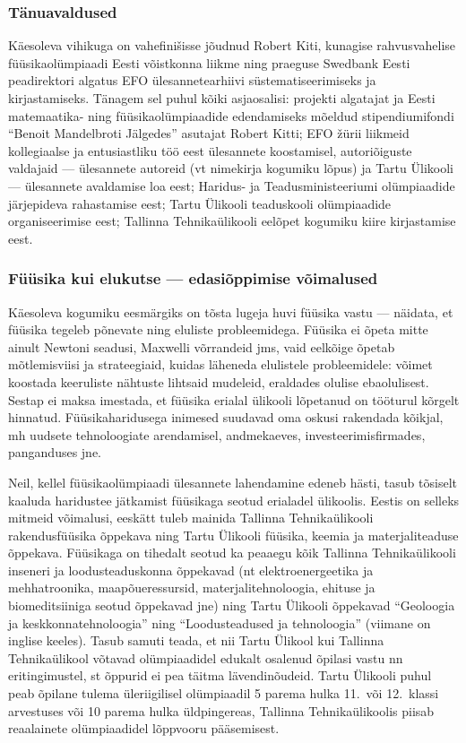\documentclass[11pt]{article}
\begin{document}
{{\subsubsection*{Tänuavaldused}
Käesoleva vihikuga on vahefinišisse jõudnud Robert Kiti, kunagise rahvusvahelise
füüsikaolümpiaadi Eesti võistkonna liikme ning
praeguse Swedbank Eesti peadirektori algatus EFO
ülesannetearhiivi süstematiseerimiseks ja kirjastamiseks.
Tänagem sel puhul kõiki asjaosalisi: projekti algatajat ja Eesti matemaatika- ning
füüsikaolümpiaadide edendamiseks mõeldud stipendiumifondi ``Benoit Mandelbroti Jälgedes'' asutajat Robert Kitti; EFO žürii liikmeid kollegiaalse ja entusiastliku töö eest ülesannete koostamisel,
autoriõiguste valdajaid --- ülesannete autoreid (vt nimekirja kogumiku lõpus) ja Tartu Ülikooli ---  ülesannete avaldamise loa eest;
Haridus- ja Teadusministeeriumi olümpiaadide järjepideva rahastamise eest; Tartu Ülikooli teaduskooli
olümpiaadide organiseerimise eest; Tallinna Tehnikaülikooli eelõpet
kogumiku kiire kirjastamise eest.

\subsubsection*{Füüsika kui elukutse --- edasiõppimise võimalused}
Käesoleva kogumiku eesmärgiks on tõsta lugeja huvi füüsika vastu --- näidata, et füüsika tegeleb põnevate ning
eluliste probleemidega. Füüsika ei õpeta mitte ainult Newtoni seadusi, Maxwelli võrrandeid jms, vaid eelkõige
õpetab mõtlemisviisi ja strateegiaid, kuidas läheneda elulistele probleemidele: võimet koostada keeruliste nähtuste
lihtsaid mudeleid, eraldades olulise ebaolulisest. Sestap ei maksa imestada, et
füüsika erialal ülikooli lõpetanud on tööturul kõrgelt hinnatud.
Füüsikaharidusega inimesed suudavad oma oskusi rakendada kõikjal, mh uudsete tehnoloogiate
arendamisel, andmekaeves, investeerimisfirmades, panganduses jne.

Neil, kellel füüsikaolümpiaadi ülesannete lahendamine edeneb hästi, tasub tõsiselt kaaluda haridustee jätkamist
füüsikaga seotud erialadel ülikoolis. Eestis on selleks mitmeid võimalusi, eeskätt tuleb mainida
{Tallinna Tehnikaülikooli rakendusfüüsika õppekava ning Tartu Ülikooli füüsika, keemia ja materjaliteaduse õppekava}.
Füüsikaga on tihedalt seotud ka peaaegu kõik
Tallinna Tehnikaülikooli inseneri ja loodusteaduskonna õppekavad (nt elektroenergeetika ja mehhatroonika, maapõueressursid,
materjalitehnoloogia, ehituse ja biomeditsiiniga seotud õppekavad jne) ning  Tartu Ülikooli õppekavad
``Geoloogia ja keskkonnatehnoloogia'' ning ``Loodusteadused ja tehnoloogia'' (viimane on inglise keeles).
Tasub samuti teada, et nii  Tartu Ülikool kui Tallinna Tehnikaülikool võtavad olümpiaadidel edukalt
osalenud õpilasi vastu nn eritingimustel, st õppurid ei pea täitma lävendinõudeid.
Tartu Ülikooli puhul peab õpilane tulema üleriigilisel olümpiaadil 5 parema hulka 11.\ või 12.\ klassi arvestuses või
10 parema hulka üldpingereas, Tallinna Tehnikaülikoolis piisab reaalainete olümpiaadidel lõppvooru pääsemisest.

}}
\end{document}
